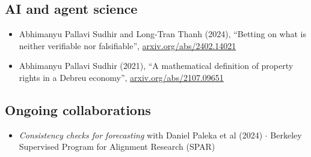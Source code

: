 \documentclass{article}
\begin{document}
\subsection*{AI and agent science}

\begin{itemize}

\item 
Abhimanyu Pallavi Sudhir and Long-Tran Thanh (2024), ``Betting on what is neither verifiable nor falsifiable'', \href{https://arxiv.org/abs/2402.14021}{arxiv.org/abs/2402.14021}

\item
Abhimanyu Pallavi Sudhir (2021),
``A mathematical definition of property rights in a Debreu economy'', 
\href{https://arxiv.org/abs/2107.09651}{arxiv.org/abs/2107.09651}

\end{itemize}

\subsection*{Ongoing collaborations}

\begin{itemize}
    
    \item \emph{Consistency checks for forecasting} with Daniel Paleka et al (2024) $\cdot$ Berkeley Supervised Program for Alignment Research (SPAR)

\end{itemize}
\end{document}
